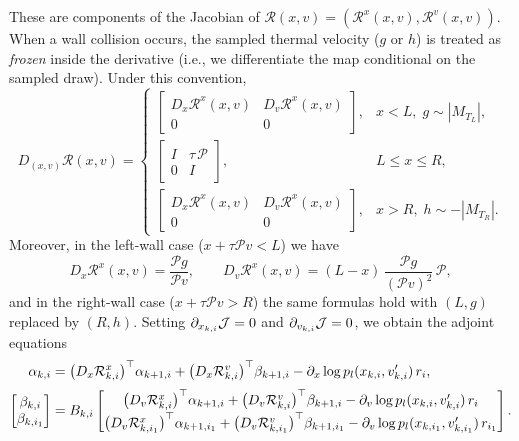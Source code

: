 \documentclass[12pt,nopreprintline]{elsarticle}
\begin{document}
These are components of the Jacobian of $\mathcal R(x,v)=(\mathcal R^x(x,v),\mathcal R^v(x,v))$. When a wall collision occurs, the sampled thermal velocity ($g$ or $h$) is treated as \emph{frozen} inside the derivative (i.e., we differentiate the map conditional on the sampled draw). Under this convention,
\begin{equation}
\label{eq:R_Jacobian}
D_{(x,v)} \mathcal{R}(x,v)
=
\begin{cases}
\begin{bmatrix}
D_x \mathcal R^x(x,v) & D_v \mathcal R^x(x,v) \\
0 & 0
\end{bmatrix},
& x<L,\; g\sim |M_{T_L}|, \\[0.25cm]
\begin{bmatrix}
I & \tau\,\mathcal P \\
0 & I
\end{bmatrix},
& L\le x \le R, \\[0.25cm]
\begin{bmatrix}
D_x \mathcal R^x(x,v) & D_v \mathcal R^x(x,v) \\
0 & 0
\end{bmatrix},
& x>R,\; h\sim -|M_{T_R}|.
\end{cases}
\end{equation}
Moreover, in the left-wall case ($x+\tau\mathcal P v<L$) we have
\[
D_x \mathcal R^x(x,v)=\frac{\mathcal P g}{\mathcal P v},
\qquad
D_v \mathcal R^x(x,v)=(L-x)\,\frac{\mathcal P g}{(\mathcal P v)^2}\,\mathcal P,
\]
and in the right-wall case ($x+\tau\mathcal P v>R$) the same formulas hold with $(L,g)$ replaced by $(R,h)$.
Setting $\partial_{x_{k,i}}\mathcal J = 0$ and $\partial_{v_{k,i}}\mathcal J = 0$, we obtain the adjoint equations
\begin{align}
\alpha_{k,i}
&=
\bigl(D_x \mathcal R^x_{k,i}\bigr)^{\top}\alpha_{k+1,i}
+
\bigl(D_x \mathcal R^v_{k,i}\bigr)^{\top}\beta_{k+1,i}
-
\partial_{x} \log p_l(x_{k,i},v'_{k,i}) \, r_i ,
\label{eq:alpha_adjoint}
\\[0.5ex]
\begin{bmatrix}
\beta_{k,i}\\
\beta_{k,i_1}
\end{bmatrix}
&=
B_{k,i}
\begin{bmatrix}
\bigl(D_v \mathcal R^x_{k,i}\bigr)^{\top}\alpha_{k+1,i}
+
\bigl(D_v \mathcal R^v_{k,i}\bigr)^{\top}\beta_{k+1,i}
-
\partial_{v} \log p_l(x_{k,i},v'_{k,i}) \, r_i
\\[0.5ex]
\bigl(D_v \mathcal R^x_{k,i_1}\bigr)^{\top}\alpha_{k+1,i_1}
+
\bigl(D_v \mathcal R^v_{k,i_1}\bigr)^{\top}\beta_{k+1,i_1}
-
\partial_{v} \log p_l(x_{k,i_1},v'_{k,i_1}) \, r_{i_1}
\end{bmatrix}.
\label{eq:beta_adjoint}
\end{align}
\end{document}
